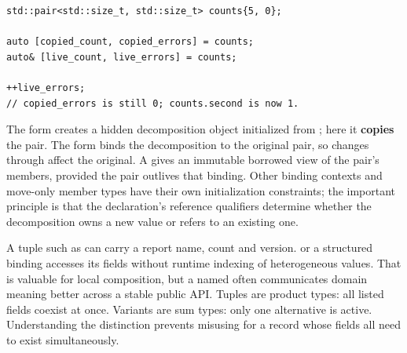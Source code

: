 \begin{verbatim}
std::pair<std::size_t, std::size_t> counts{5, 0};

auto [copied_count, copied_errors] = counts;
auto& [live_count, live_errors] = counts;

++live_errors;
// copied_errors is still 0; counts.second is now 1.
\end{verbatim}

The  form creates a hidden decomposition object initialized from ; here it \textbf{copies} the pair. The  form binds the decomposition to the original pair, so changes through  affect the original. A  gives an immutable borrowed view of the pair's members, provided the pair outlives that binding. Other binding contexts and move-only member types have their own initialization constraints; the important principle is that the declaration's reference qualifiers determine whether the decomposition owns a new value or refers to an existing one.

A tuple such as  can carry a report name, count and version.  or a structured binding accesses its fields without runtime indexing of heterogeneous values. That is valuable for local composition, but a named  often communicates domain meaning better across a stable public API. Tuples are product types: all listed fields coexist at once. Variants are sum types: only one alternative is active. Understanding the distinction prevents misusing  for a record whose fields all need to exist simultaneously.

